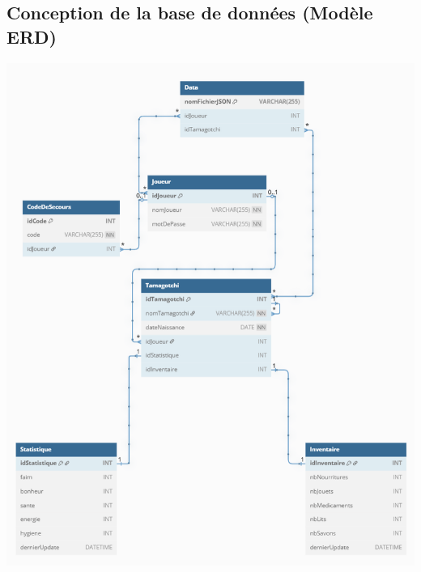 \documentclass{conception_detaillee}
\begin{document}
\begin{itemize}[label=\textbullet]
\section{Conception de la base de données (Modèle ERD)}
\noindent\includegraphics{images/erd2.png}

\end{itemize}
\end{document}

